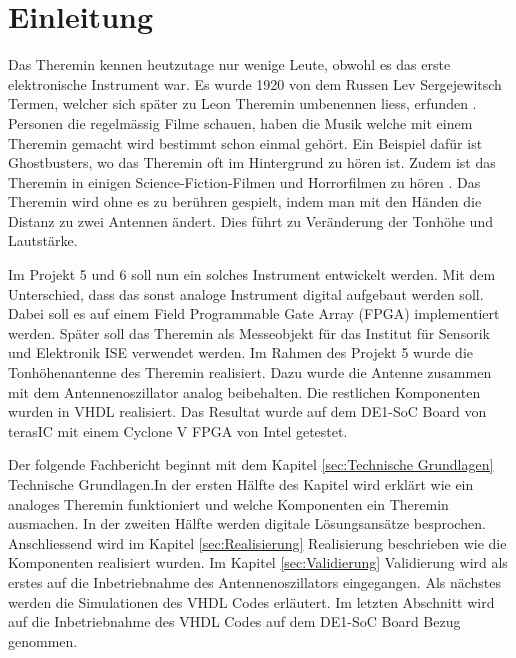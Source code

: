 \clearpage
\section{Einleitung}\label{sec:Einleitung}
Das Theremin kennen heutzutage nur wenige Leute, obwohl es das erste elektronische Instrument war. Es wurde 1920 von dem Russen Lev Sergejewitsch Termen, welcher sich später zu Leon Theremin umbenennen liess, erfunden \cite{Theremin_h}. Personen die regelmässig Filme schauen, haben die Musik welche mit einem Theremin gemacht wird bestimmt schon einmal gehört. Ein Beispiel dafür ist Ghostbusters, wo das Theremin oft im Hintergrund zu hören ist. Zudem ist das Theremin in einigen Science-Fiction-Filmen und Horrorfilmen zu hören \cite{Goast_m}. Das Theremin wird ohne es zu berühren gespielt, indem man mit den Händen die Distanz zu zwei Antennen ändert. Dies führt zu Veränderung der Tonhöhe und Lautstärke.

Im Projekt 5 und 6 soll nun ein solches Instrument entwickelt werden. Mit dem Unterschied, dass das sonst analoge Instrument digital aufgebaut werden soll. Dabei soll es auf einem Field Programmable Gate Array (FPGA) implementiert werden. Später soll das Theremin als Messeobjekt für das Institut für Sensorik und Elektronik ISE verwendet werden. Im Rahmen des Projekt 5 wurde die Tonhöhenantenne des Theremin realisiert. Dazu wurde die Antenne zusammen mit dem Antennenoszillator analog beibehalten. Die restlichen Komponenten wurden in VHDL realisiert. Das Resultat wurde auf dem DE1-SoC Board von terasIC mit einem Cyclone V FPGA von Intel getestet.

Der folgende Fachbericht beginnt mit dem Kapitel \ref{sec:Technische Grundlagen} Technische Grundlagen.In der ersten Hälfte des Kapitel wird erklärt wie ein analoges Theremin funktioniert und welche Komponenten ein Theremin ausmachen. In der zweiten Hälfte werden digitale Lösungsansätze besprochen. Anschliessend wird im Kapitel \ref{sec:Realisierung} Realisierung beschrieben wie die Komponenten realisiert wurden. Im Kapitel \ref{sec:Validierung} Validierung wird als erstes auf die Inbetriebnahme des Antennenoszillators eingegangen. Als nächstes werden die Simulationen des VHDL Codes erläutert. Im letzten Abschnitt wird auf die Inbetriebnahme des VHDL Codes auf dem DE1-SoC Board Bezug genommen.





